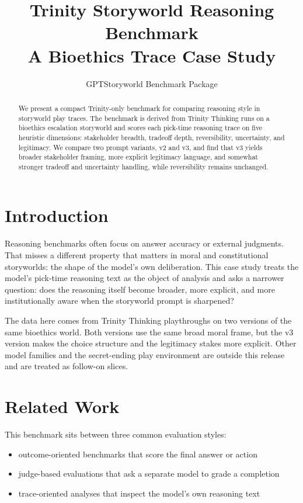 \documentclass[11pt]{article}
\title{Trinity Storyworld Reasoning Benchmark\\A Bioethics Trace Case Study}
\author{GPTStoryworld Benchmark Package}
\date{}
\begin{document}
\maketitle

\begin{abstract}
We present a compact Trinity-only benchmark for comparing reasoning style in storyworld play traces. The benchmark is derived from Trinity Thinking runs on a bioethics escalation storyworld and scores each pick-time reasoning trace on five heuristic dimensions: stakeholder breadth, tradeoff depth, reversibility, uncertainty, and legitimacy. We compare two prompt variants, v2 and v3, and find that v3 yields broader stakeholder framing, more explicit legitimacy language, and somewhat stronger tradeoff and uncertainty handling, while reversibility remains unchanged.
\end{abstract}

\section{Introduction}
Reasoning benchmarks often focus on answer accuracy or external judgments. That misses a different property that matters in moral and constitutional storyworlds: the shape of the model's own deliberation. This case study treats the model's pick-time reasoning text as the object of analysis and asks a narrower question: does the reasoning itself become broader, more explicit, and more institutionally aware when the storyworld prompt is sharpened?

The data here comes from Trinity Thinking playthroughs on two versions of the same bioethics world. Both versions use the same broad moral frame, but the v3 version makes the choice structure and the legitimacy stakes more explicit. Other model families and the secret-ending play environment are outside this release and are treated as follow-on slices.

\section{Related Work}
This benchmark sits between three common evaluation styles:
\begin{itemize}
  \item outcome-oriented benchmarks that score the final answer or action
  \item judge-based evaluations that ask a separate model to grade a completion
  \item trace-oriented analyses that inspect the model's own reasoning text
\end{itemize}
\end{document}
